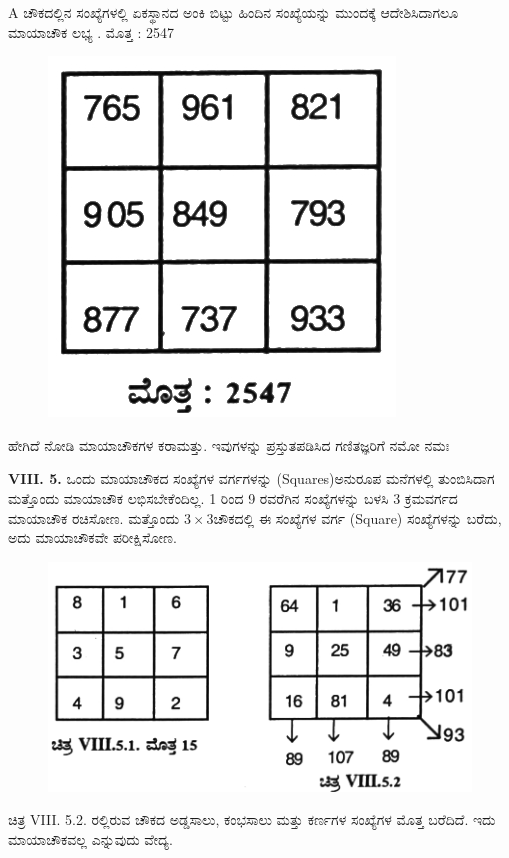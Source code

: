 A ಚೌಕದಲ್ಲಿನ ಸಂಖ್ಯೆಗಳಲ್ಲಿ ಏಕಸ್ಥಾನದ ಅಂಕಿ ಬಿಟ್ಟು ಹಿಂದಿನ ಸಂಖ್ಯೆಯನ್ನು ಮುಂದಕ್ಕೆ ಆದೇಶಿಸಿದಾಗಲೂ ಮಾಯಾಚೌಕ ಲಭ್ಯ . ಮೊತ್ತ : 2547
\begin{figure}[H]
\includegraphics{src/figures/chap7/fig7-15.jpg}
\end{figure}

ಹೇಗಿದೆ ನೋಡಿ ಮಾಯಾಚೌಕಗಳ ಕರಾಮತ್ತು. ಇವುಗಳನ್ನು ಪ್ರಸ್ತುತಪಡಿಸಿದ ಗಣಿತಜ್ಞರಿಗೆ ನಮೋ ನಮಃ

\textbf{VIII. 5.} ಒಂದು ಮಾಯಾಚೌಕದ ಸಂಖ್ಯೆಗಳ ವರ್ಗಗಳನ್ನು (Squares)ಅನುರೂಪ ಮನೆಗಳಲ್ಲಿ ತುಂಬಿಸಿದಾಗ ಮತ್ತೊಂದು ಮಾಯಾಚೌಕ ಲಭಿಸಬೇಕೆಂದಿಲ್ಲ. 1 ರಿಂದ 9 ರವರೆಗಿನ ಸಂಖ್ಯೆಗಳನ್ನು ಬಳಸಿ 3 ಕ್ರಮವರ್ಗದ ಮಾಯಾಚೌಕ ರಚಿಸೋಣ. ಮತ್ತೊಂದು $3 \times 3$ಚೌಕದಲ್ಲಿ ಈ ಸಂಖ್ಯೆಗಳ ವರ್ಗ (Square) ಸಂಖ್ಯೆಗಳನ್ನು ಬರೆದು, ಅದು ಮಾಯಾಚೌಕವೇ ಪರೀಕ್ಷಿಸೋಣ.
\begin{figure}[H]
\includegraphics{src/figures/chap7/fig7-16.jpg}
\end{figure}

ಚಿತ್ರ VIII. 5.2. ರಲ್ಲಿರುವ ಚೌಕದ ಅಡ್ಡಸಾಲು, ಕಂಭಸಾಲು ಮತ್ತು ಕರ್ಣಗಳ ಸಂಖ್ಯೆಗಳ ಮೊತ್ತ ಬರೆದಿದೆ. ಇದು ಮಾಯಾಚೌಕವಲ್ಲ ಎನ್ನುವುದು ವೇದ್ಯ.

